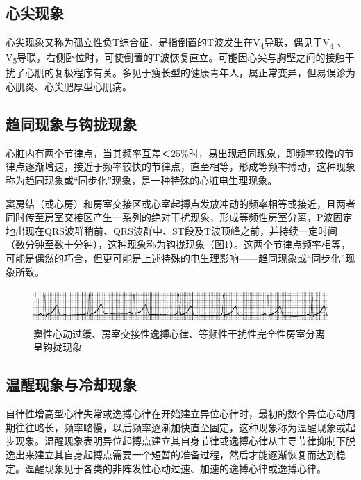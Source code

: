 \protect\hypertarget{text00047.htmlux5cux23subid523}{}{}

\subsection{心尖现象}

心尖现象又称为孤立性负T综合征，是指倒置的T波发生在V\textsubscript{4}导联，偶见于V\textsubscript{4} 、V\textsubscript{5}导联，右侧卧位时，可使倒置的T波恢复直立。可能因心尖与胸壁之间的接触干扰了心肌的复极程序有关。多见于瘦长型的健康青年人，属正常变异，但易误诊为心肌炎、心尖肥厚型心肌病。

\protect\hypertarget{text00047.htmlux5cux23subid524}{}{}

\subsection{趋同现象与钩拢现象}

心脏内有两个节律点，当其频率互差＜25\%时，易出现趋同现象，即频率较慢的节律点逐渐增速，接近于频率较快的节律点，直至相等，形成等频率搏动，这种现象称为趋同现象或“同步化”现象，是一种特殊的心脏电生理现象。

窦房结（或心房）和房室交接区或心室起搏点发放冲动的频率相等或接近，且两者同时传至房室交接区产生一系列的绝对干扰现象，形成等频性房室分离，P波固定地出现在QRS波群稍前、QRS波群中、ST段及T波顶峰之前，并持续一定时间（数分钟至数十分钟），这种现象称为钩拢现象（图\ref{fig40-1}）。这两个节律点频率相等，可能是偶然的巧合，但更可能是上述特殊的电生理影响------趋同现象或“同步化”现象所致。

\begin{figure}[!htbp]
 \centering
 \includegraphics[width=5.58333in,height=0.53125in]{./images/Image00662.jpg}
 \captionsetup{justification=centering}
 \caption{窦性心动过缓、房室交接性逸搏心律、等频性干扰性完全性房室分离呈钩拢现象}
 \label{fig40-1}
  \end{figure} 

\protect\hypertarget{text00047.htmlux5cux23subid525}{}{}

\subsection{温醒现象与冷却现象}

自律性增高型心律失常或逸搏心律在开始建立异位心律时，最初的数个异位心动周期往往略长，频率略慢，以后频率逐渐加快直至固定，这种现象称为温醒现象或起步现象。温醒现象表明异位起搏点建立其自身节律或逸搏心律从主导节律抑制下脱逸出来建立其自身起搏点需要一个短暂的准备过程，然后才能逐渐恢复而达到稳定。温醒现象见于各类的非阵发性心动过速、加速的逸搏心律或逸搏心律。


